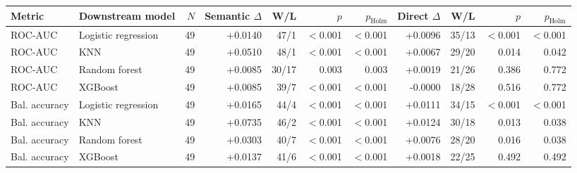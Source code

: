 \begin{tabular}{llrrrrrrrrr}
\toprule
Metric & Downstream model & $N$ & Semantic $\Delta$ & W/L & $p$ & $p_{\mathrm{Holm}}$ & Direct $\Delta$ & W/L & $p$ & $p_{\mathrm{Holm}}$ \\
\midrule
ROC-AUC & Logistic regression & 49 & +0.0140 & 47/1 & $<$0.001 & $<$0.001 & +0.0096 & 35/13 & $<$0.001 & $<$0.001 \\
ROC-AUC & KNN & 49 & +0.0510 & 48/1 & $<$0.001 & $<$0.001 & +0.0067 & 29/20 & 0.014 & 0.042 \\
ROC-AUC & Random forest & 49 & +0.0085 & 30/17 & 0.003 & 0.003 & +0.0019 & 21/26 & 0.386 & 0.772 \\
ROC-AUC & XGBoost & 49 & +0.0085 & 39/7 & $<$0.001 & $<$0.001 & -0.0000 & 18/28 & 0.516 & 0.772 \\
\midrule
Bal. accuracy & Logistic regression & 49 & +0.0165 & 44/4 & $<$0.001 & $<$0.001 & +0.0111 & 34/15 & $<$0.001 & $<$0.001 \\
Bal. accuracy & KNN & 49 & +0.0735 & 46/2 & $<$0.001 & $<$0.001 & +0.0124 & 30/18 & 0.013 & 0.038 \\
Bal. accuracy & Random forest & 49 & +0.0303 & 40/7 & $<$0.001 & $<$0.001 & +0.0076 & 28/20 & 0.016 & 0.038 \\
Bal. accuracy & XGBoost & 49 & +0.0137 & 41/6 & $<$0.001 & $<$0.001 & +0.0018 & 22/25 & 0.492 & 0.492 \\
\bottomrule
\end{tabular}
